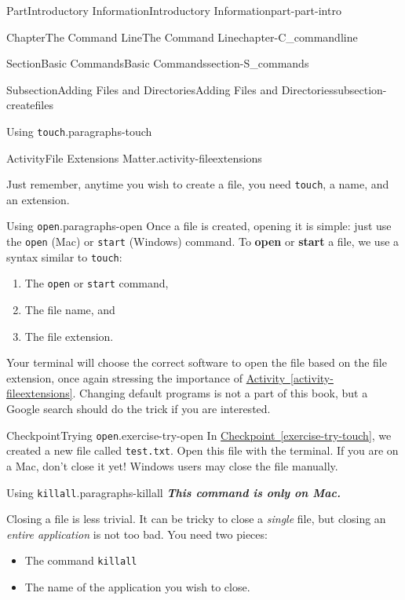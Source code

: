 \documentclass[oneside,10pt,]{book}
\newcommand{\xreffont}{\relax}
\newcommand{\mono}[1]{\texttt{#1}}
\newcommand{\alert}[1]{\textbf{\textit{#1}}}
\newcommand{\terminology}[1]{\textbf{#1}}
\begin{document}
\begin{partptx}{Part}{Introductory Information}{}{Introductory Information}{}{}{part-part-intro}
\begin{chapterptx}{Chapter}{The Command Line}{}{The Command Line}{}{}{chapter-C_commandline}
\begin{sectionptx}{Section}{Basic Commands}{}{Basic Commands}{}{}{section-S_commands}
\begin{subsectionptx}{Subsection}{Adding Files and Directories}{}{Adding Files and Directories}{}{}{subsection-createfiles}
\begin{paragraphs}{Using \mono{touch}.}{paragraphs-touch}
\begin{activity}{Activity}{File Extensions Matter.}{activity-fileextensions}
\end{activity}%
Just remember, anytime you wish to create a file, you need \mono{touch}, a name, and an extension.%
\end{paragraphs}%
\begin{paragraphs}{Using \mono{open}.}{paragraphs-open}%
\index{\mono{open}}%
\index{\mono{start}}%
%
%
%
Once a file is created, opening it is simple: just use the \mono{open} (Mac) or \mono{start} (Windows) command. To \terminology{open} or \terminology{start} a file, we use a syntax similar to \mono{touch}:%
\begin{enumerate}
\item{}The \mono{open} or \mono{start} command,%
\item{}The file name, and%
\item{}The file extension.%
\end{enumerate}
Your terminal will choose the correct software to open the file based on the file extension, once again stressing the importance of \hyperref[activity-fileextensions]{Activity~{\xreffont\ref{activity-fileextensions}}}. Changing default programs is not a part of this book, but a Google search should do the trick if you are interested.%
\begin{inlineexercise}{Checkpoint}{Trying \mono{open}.}{exercise-try-open}%
In \hyperref[exercise-try-touch]{Checkpoint~{\xreffont\ref{exercise-try-touch}}}, we created a new file called \mono{test.txt}. Open this file with the terminal. If you are on a Mac, don't close it yet! Windows users may close the file manually.%
\end{inlineexercise}%
\end{paragraphs}%
\begin{paragraphs}{Using \mono{killall}.}{paragraphs-killall}%
\index{\mono{killall}}%
%
\index{command line!\mono{killall}}%
\alert{This command is only on Mac.}%
\par
Closing a file is less trivial. It can be tricky to close a \emph{single} file, but closing an \emph{entire application} is not too bad. You need two pieces:%
\begin{itemize}[label=\textbullet]
\item{}The command \mono{killall}%
\item{}The name of the application you wish to close.%
\end{itemize}

\end{paragraphs}
\end{subsectionptx}
\end{sectionptx}
\end{chapterptx}
\end{partptx}
\end{document}

